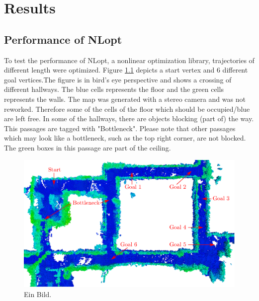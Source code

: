 \chapter{Results}\label{chap:Results}

\section{Performance of NLopt}

To test the performance of NLopt, a nonlinear optimization library, trajectories of different length were optimized. Figure \ref{pic:differentGoal} depicts a start vertex and 6 different goal vertices.The figure is in bird's eye perspective and shows a crossing of different hallways. The blue cells represents the floor and the green cells represents the walls. The map was generated with a stereo camera and was not reworked. Therefore some of the cells of the floor which should be occupied/blue are left free. In some of the hallways, there are objects blocking (part of) the way. This passages are tagged with "Bottleneck". Please note that other passages which may look like a bottleneck, such as the top right corner, are not blocked. The green boxes in this passage are part of the ceiling.

\begin{figure}[h]
   \centering
   \includegraphics[width=1\textwidth]{pics/ML4.eps}
   \caption{Ein Bild.}
   \label{pic:differentGoal}
\end{figure}

%
%

